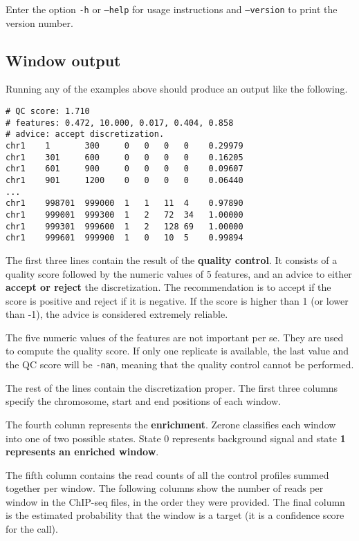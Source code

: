 \documentclass[12pt]{article}
\begin{document}
Enter the option \texttt{-h} or \texttt{--help} for usage instructions and
\texttt{--version} to print the version number.

\subsection{Window output}

Running any of the examples above should produce an output like
the following.

\begin{verbatim}
# QC score: 1.710
# features: 0.472, 10.000, 0.017, 0.404, 0.858
# advice: accept discretization.
chr1    1       300     0   0   0   0    0.29979
chr1    301     600     0   0   0   0    0.16205
chr1    601     900     0   0   0   0    0.09607
chr1    901     1200    0   0   0   0    0.06440
...
chr1    998701  999000  1   1   11  4    0.97890
chr1    999001  999300  1   2   72  34   1.00000
chr1    999301  999600  1   2   128 69   1.00000
chr1    999601  999900  1   0   10  5    0.99894
\end{verbatim}

\begin{mdframed}
The first three lines contain the result of the \textbf{quality control}.
It consists of a quality score followed by the numeric values of 5
features, and an advice to either \textbf{accept or reject} the
discretization. The recommendation is to accept if the score is positive
and reject if it is negative. If the score is higher than 1 (or lower
than -1), the advice is considered extremely reliable.
\end{mdframed}

The five numeric values of the features are not important per se.
They are used to compute the quality score. If only one replicate is
available, the last value and the QC score will be \texttt{-nan},
meaning that the quality control cannot be performed.

The rest of the lines contain the discretization proper.
The first three columns specify the chromosome, start and end
positions of each window.

\begin{mdframed}
The fourth column represents the \textbf{enrichment}. Zerone classifies
each window into one of two possible states. State 0 represents
background signal and state \textbf{1 represents an enriched window}.
\end{mdframed}

The fifth column contains the read counts of all the control profiles
summed together per window. The following columns show the number of
reads per window in the ChIP-seq files, in the order they were provided.
The final column is the estimated probability that the window is a
target (it is a confidence score for the call).
\end{document}
